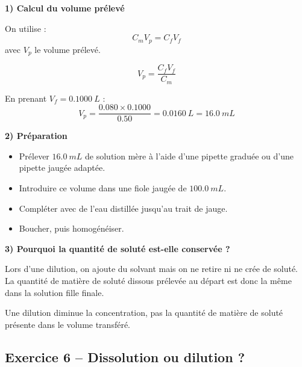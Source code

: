 \documentclass[11pt,a4paper]{article}
\begin{document}
\begin{corrigebox}
\textbf{1) Calcul du volume prélevé}

On utilise :
\[
C_m V_p = C_f V_f
\]
avec \(V_p\) le volume prélevé.

\[
V_p = \frac{C_f V_f}{C_m}
\]

En prenant \(V_f = \SI{0.1000}{L}\) :
\[
V_p = \frac{0.080 \times 0.1000}{0.50} = \SI{0.0160}{L} = \SI{16.0}{mL}
\]

\textbf{2) Préparation}

\begin{itemize}
    \item Prélever \(\SI{16.0}{mL}\) de solution mère à l'aide d'une pipette graduée ou d'une pipette jaugée adaptée.
    \item Introduire ce volume dans une fiole jaugée de \(\SI{100.0}{mL}\).
    \item Compléter avec de l'eau distillée jusqu'au trait de jauge.
    \item Boucher, puis homogénéiser.
\end{itemize}

\textbf{3) Pourquoi la quantité de soluté est-elle conservée ?}

Lors d'une dilution, on ajoute du solvant mais on ne retire ni ne crée de soluté.  
La quantité de matière de soluté dissous prélevée au départ est donc la même dans la solution fille finale.

\begin{attentionbox}
Une dilution diminue la concentration, pas la quantité de matière de soluté présente dans le volume transféré.
\end{attentionbox}
\end{corrigebox}

\subsection{Exercice 6 -- Dissolution ou dilution ?}
\end{document}
